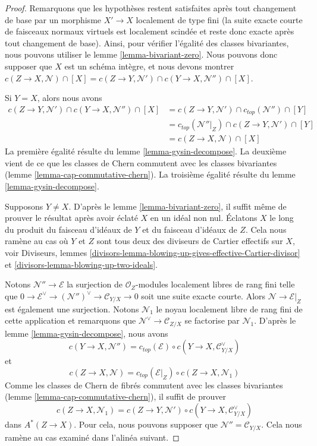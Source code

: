 \begin{proof}
Remarquons que les hypothèses restent satisfaites après tout changement de base
par un morphisme $X' \to X$ localement de type fini (la suite
exacte courte de faisceaux normaux virtuels est localement scindée et
reste donc exacte après tout changement de base). Ainsi, pour vérifier
l'égalité des classes bivariantes, nous pouvons utiliser le lemme \ref{lemma-bivariant-zero}.
Nous pouvons donc supposer que $X$ est un schéma intègre, et nous devons montrer
$c(Z \to X, \mathcal{N}) \cap [X] =
c(Z \to Y, \mathcal{N}') \cap c(Y \to X, \mathcal{N}'') \cap [X]$.

\medskip\noindent
Si $Y = X$, alors nous avons
\begin{align*}
c(Z \to Y, \mathcal{N}') \cap c(Y \to X, \mathcal{N}'') \cap [X]
& =
c(Z \to Y, \mathcal{N}') \cap c_{top}(\mathcal{N}'') \cap [Y] \\
& =
c_{top}(\mathcal{N}''|_Z) \cap c(Z \to Y, \mathcal{N}') \cap [Y] \\
& =
c(Z \to X, \mathcal{N}) \cap [X] 
\end{align*}
La première égalité résulte du lemme \ref{lemma-gysin-decompose}.
La deuxième vient de ce que les classes de Chern commutent avec les classes bivariantes
(lemme \ref{lemma-cap-commutative-chern}).
La troisième égalité résulte du lemme \ref{lemma-gysin-decompose}.

\medskip\noindent
Supposons $Y \not = X$. D'après le lemme \ref{lemma-bivariant-zero},
il suffit même de prouver le résultat après avoir éclaté $X$ en un idéal non nul.
Éclatons $X$ le long du produit du faisceau d'idéaux de $Y$ et du faisceau
d'idéaux de $Z$. Cela nous ramène au cas où $Y$ et $Z$ sont tous deux des
diviseurs de Cartier effectifs sur $X$, voir
Diviseurs, lemmes
\ref{divisors-lemma-blowing-up-gives-effective-Cartier-divisor} et
\ref{divisors-lemma-blowing-up-two-ideals}.

\medskip\noindent
Notons $\mathcal{N}'' \to \mathcal{E}$ la surjection de
$\mathcal{O}_Z$-modules localement libres de rang fini telle que
$0 \to \mathcal{E}^\vee \to (\mathcal{N}'')^\vee \to \mathcal{C}_{Y/X} \to 0$
soit une suite exacte courte. Alors $\mathcal{N} \to \mathcal{E}|_Z$
est également une surjection. Notons $\mathcal{N}_1$ le noyau localement libre de rang fini
de cette application et remarquons que $\mathcal{N}^\vee \to \mathcal{C}_{Z/X}$
se factorise par $\mathcal{N}_1$.
D'après le lemme \ref{lemma-gysin-decompose}, nous avons
$$
c(Y \to X, \mathcal{N}'') = c_{top}(\mathcal{E}) \circ
c(Y \to X, \mathcal{C}_{Y/X}^\vee)
$$
et
$$
c(Z \to X, \mathcal{N}) = c_{top}(\mathcal{E}|_Z) \circ
c(Z \to X, \mathcal{N}_1)
$$
Comme les classes de Chern de fibrés commutent avec les classes bivariantes
(lemme \ref{lemma-cap-commutative-chern}),
il suffit de prouver
$$
c(Z \to X, \mathcal{N}_1) =
c(Z \to Y, \mathcal{N}') \circ c(Y \to X, \mathcal{C}_{Y/X}^\vee)
$$
dans $A^*(Z \to X)$. Pour cela, nous pouvons supposer que $\mathcal{N}'' = \mathcal{C}_{Y/X}$.
Cela nous ramène au cas examiné dans l'alinéa suivant.


\end{proof}
